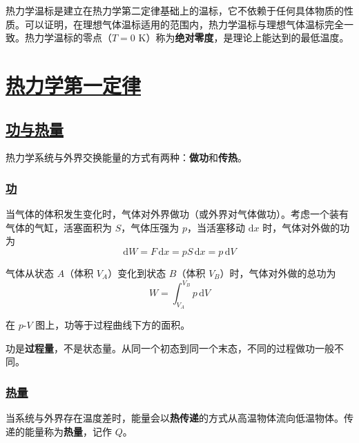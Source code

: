 热力学温标是建立在热力学第二定律基础上的温标，它不依赖于任何具体物质的性质。可以证明，在理想气体温标适用的范围内，热力学温标与理想气体温标完全一致。热力学温标的零点（$T = 0$ K）称为\textbf{绝对零度}，是理论上能达到的最低温度。


\section{\protect\hyperlink{:}{热力学第一定律}}

\subsection{\protect\hyperlink{:}{功与热量}}

热力学系统与外界交换能量的方式有两种：\textbf{做功}和\textbf{传热}。

\subsubsection{\protect\hyperlink{:}{功}}

当气体的体积发生变化时，气体对外界做功（或外界对气体做功）。考虑一个装有气体的气缸，活塞面积为 $S$，气体压强为 $p$，当活塞移动 $\mathrm{d}x$ 时，气体对外做的功为
\begin{equation}
    \mathrm{d}W = F\,\mathrm{d}x = pS\,\mathrm{d}x = p\,\mathrm{d}V
\end{equation}

气体从状态 $A$（体积 $V_A$）变化到状态 $B$（体积 $V_B$）时，气体对外做的总功为
\begin{equation}
    W = \int_{V_A}^{V_B} p\,\mathrm{d}V
\end{equation}

在 $p$-$V$ 图上，功等于过程曲线下方的面积。

\begin{remark}
    功是\textbf{过程量}，不是状态量。从同一个初态到同一个末态，不同的过程做功一般不同。
\end{remark}

\subsubsection{\protect\hyperlink{:}{热量}}

当系统与外界存在温度差时，能量会以\textbf{热传递}的方式从高温物体流向低温物体。传递的能量称为\textbf{热量}，记作 $Q$。

